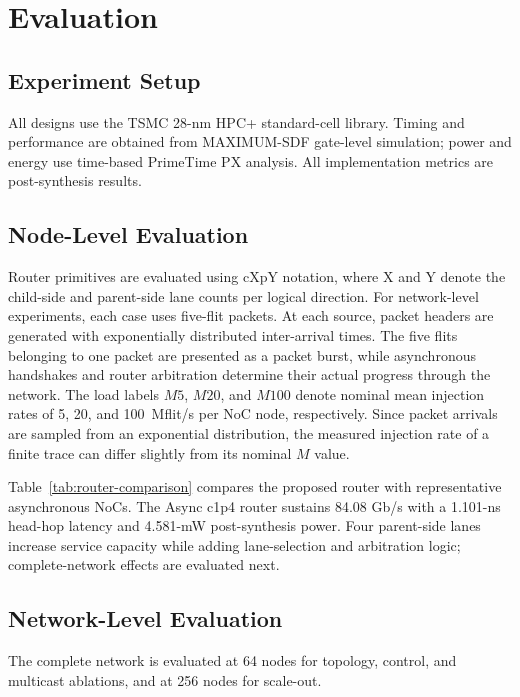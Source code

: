 \documentclass[conference]{IEEEtran}
\begin{document}
\section{Evaluation}\label{sec:evaluation}

\subsection{Experiment Setup}\label{sec:setup}

All designs use the TSMC 28-nm HPC+ standard-cell library. Timing and performance are obtained from
MAXIMUM-SDF gate-level simulation; power and energy use time-based PrimeTime
PX analysis. All implementation metrics are post-synthesis results.

\subsection{Node-Level Evaluation}\label{sec:node-eval}

Router primitives are evaluated using cXpY notation, where X and Y denote
the child-side and parent-side lane counts per logical direction.
For network-level experiments, each case uses five-flit packets. At each
source, packet headers are generated with exponentially distributed
inter-arrival times. The five flits belonging to one packet are presented as a
packet burst, while asynchronous handshakes and router arbitration determine
their actual progress through the network. The load labels \(M5\), \(M20\),
and \(M100\) denote nominal mean injection rates of 5, 20, and
100~Mflit/s per NoC node, respectively. Since packet arrivals are sampled
from an exponential distribution, the measured injection rate of a finite
trace can differ slightly from its nominal \(M\) value.



Table~\ref{tab:router-comparison} compares the proposed router with
representative asynchronous NoCs. The Async c1p4 router sustains 84.08 Gb/s with a
1.101-ns head-hop latency and 4.581-mW post-synthesis power. Four parent-side
lanes increase service capacity while adding lane-selection and arbitration
logic; complete-network effects are evaluated next.

\subsection{Network-Level Evaluation}\label{sec:network-eval}

The complete network is evaluated at 64 nodes for topology, control, and
multicast ablations, and at 256 nodes for scale-out.
\end{document}
